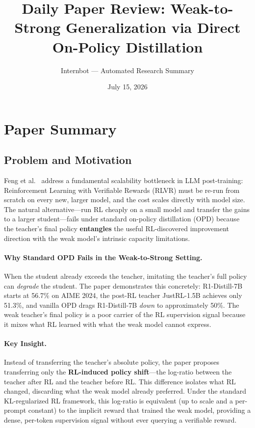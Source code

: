 \documentclass[11pt,a4paper]{article}
\title{Daily Paper Review: Weak-to-Strong Generalization via Direct\\On-Policy Distillation}
\author{Internbot --- Automated Research Summary}
\date{July 15, 2026}
\begin{document}
\maketitle

\section{Paper Summary}

\subsection{Problem and Motivation}

Feng et al.~\cite{feng2026direct} address a fundamental scalability bottleneck in LLM post-training: Reinforcement Learning with Verifiable Rewards (RLVR) must be re-run from scratch on every new, larger model, and the cost scales directly with model size. The natural alternative---run RL cheaply on a small model and transfer the gains to a larger student---fails under standard on-policy distillation (OPD) because the teacher's final policy \textbf{entangles} the useful RL-discovered improvement direction with the weak model's intrinsic capacity limitations.

\paragraph{Why Standard OPD Fails in the Weak-to-Strong Setting.} When the student already exceeds the teacher, imitating the teacher's full policy can \emph{degrade} the student. The paper demonstrates this concretely: R1-Distill-7B starts at 56.7\% on AIME 2024, the post-RL teacher JustRL-1.5B achieves only 51.3\%, and vanilla OPD drags R1-Distill-7B \emph{down} to approximately 50\%. The weak teacher's final policy is a poor carrier of the RL supervision signal because it mixes what RL learned with what the weak model cannot express.

\paragraph{Key Insight.} Instead of transferring the teacher's absolute policy, the paper proposes transferring only the \textbf{RL-induced policy shift}---the log-ratio between the teacher after RL and the teacher before RL. This difference isolates what RL changed, discarding what the weak model already preferred. Under the standard KL-regularized RL framework, this log-ratio is equivalent (up to scale and a per-prompt constant) to the implicit reward that trained the weak model, providing a dense, per-token supervision signal without ever querying a verifiable reward.
\end{document}
